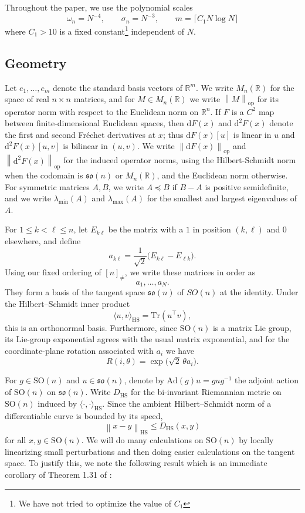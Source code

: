 \documentclass[11pt, reqno]{amsart}
\numberwithin{equation}{section}
\theoremstyle{remark}
\newcommand{\R}{\mathbb{R}}
\newcommand{\1}{\mathbf{1}}
\newcommand{\SO}{\mathrm{SO}}
\newcommand{\so}{\mathfrak{so}}
\newcommand{\HS}{\mathrm{HS}}
\newcommand{\op}{\mathrm{op}}
\newcommand{\Tr}{\mathrm{Tr}}
\newcommand{\Ad}{\mathrm{Ad}}
\newcommand{\dd}{\mathrm{d}}
\newcommand{\ip}[2]{\langle #1,#2\rangle}
\newcommand{\norm}[1]{\left\lVert #1\right\rVert}
\begin{document}
Throughout the paper, we use the polynomial scales
\begin{equation}
\label{eq:scales}
\omega_n = N^{-4},
\qquad
\sigma_n = N^{-3},
\qquad
m = \lceil C_1 N\log N\rceil
\end{equation}
where $C_1>10$ is a fixed constant\footnote{We have not tried to optimize the value of $C_1$} independent of $N$.

\subsection{Geometry}

Let $e_1,\dots,e_m$ denote the standard basis vectors of $\R^m$. We write $M_n(\R)$ for the space of real $n\times n$ matrices, and for $M\in M_n(\R)$ we write $\norm{M}_{\op}$ for its operator norm with respect to the Euclidean norm on $\R^n$. If $F$ is a $C^2$ map between finite-dimensional Euclidean spaces, then $\dd F(x)$ and $\dd^2F(x)$ denote the first and second Fr\'echet derivatives at $x$; thus $\dd F(x)[u]$ is linear in $u$ and $\dd^2F(x)[u,v]$ is bilinear in $(u,v)$. We write $\norm{\dd F(x)}_{\op}$ and $\norm{\dd^2F(x)}_{\op}$ for the induced operator norms, using the Hilbert-Schmidt norm when the codomain is $\so(n)$ or $M_n(\R)$, and the Euclidean norm otherwise. For symmetric matrices
$A,B$, we write $A\preceq B$ if $B-A$ is positive semidefinite, and we write
$\lambda_{\min}(A)$ and $\lambda_{\max}(A)$ for the smallest and largest eigenvalues of $A$. 

For $1\le k<\ell\le n$, let $E_{k\ell}$ be the matrix with a $1$ in position $(k,\ell)$ and $0$ elsewhere, and define
\[
a_{k\ell} = \frac{1}{\sqrt{2}}\bigl(E_{k\ell}-E_{\ell k}\bigr).
\]
Using our fixed ordering of $[n]_{\neq}$, we write these matrices in order as
\[
a_1,\dots,a_N.
\]
They form a basis of the tangent space $\so(n)$ of $SO(n)$ at the identity. Under the Hilbert--Schmidt inner product
\[
\ip{u}{v}_{\HS} = \Tr(u^\top v),
\]
this is an orthonormal basis. Furthermore, since $\SO(n)$ is a matrix Lie group, its Lie-group exponential agrees with the usual matrix exponential, and for the coordinate-plane rotation associated with $a_i$ we have
\[
R(i,\theta) = \exp \!\bigl(\sqrt{2}\,\theta a_i\bigr).
\]

For $g\in \SO(n)$ and $u\in \so(n)$, denote by $\Ad(g)u=gug^{-1}$ the adjoint action of $\SO(n)$ on $\so(n)$. Write $D_{\HS}$ for the bi-invariant Riemannian metric on $\SO(n)$ induced by
$\ip{\cdot}{\cdot}_{\HS}$.
Since the ambient Hilbert--Schmidt norm of a differentiable curve is bounded by its speed,
\begin{equation}
\label{eq:ambient-vs-riem}
\norm{x-y}_{\HS} \le D_{\HS}(x,y)
\end{equation}
for all $x,y\in \SO(n)$. We will do many calculations on $\SO(n)$ by locally linearizing small perturbations and then doing easier calculations on the tangent space. To justify this, we note the following result which is an immediate corollary of Theorem 1.31 of \cite{high:FM}:
\end{document}
